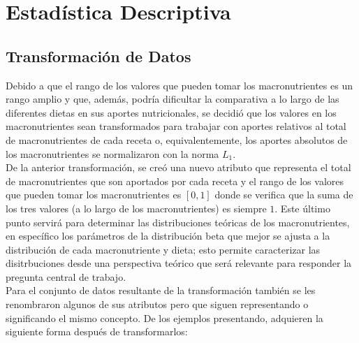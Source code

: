 \documentclass[12pt,a4paper]{article}
\begin{document}
\newpage

\section{Estadística Descriptiva}

    \subsection{Transformación de Datos}\label{subsec:data_trans}

        Debido a que el rango de los valores que pueden tomar los macronutrientes 
        es un rango amplio y que, además, podría dificultar la comparativa a lo largo 
        de las diferentes dietas en sus aportes nutricionales, se decidió que los 
        valores en los macronutrientes sean transformados para trabajar con aportes 
        relativos al total de macronutrientes de cada receta o, equivalentemente, los 
        aportes absolutos de los macronutrientes se normalizaron con la norma $L_1$.\\

        De la anterior transformación, se creó una nuevo atributo que representa el 
        total de macronutrientes que son aportados por cada receta y el rango de los 
        valores que pueden tomar los macronutrientes es $[0,1]$ donde se verifica que 
        la suma de los tres valores (a lo largo de los macronutrientes) es siempre $1$. 
        Este último punto servirá para determinar las distribuciones teóricas de los 
        macronutrientes, en específico los parámetros de la distribución beta que mejor 
        se ajusta a la distribución de cada macronutriente y dieta; esto permite caracterizar 
        las disitrbuciones desde una perspectiva teórico que será relevante para responder 
        la pregunta central de trabajo.\\

        Para el conjunto de datos resultante de la transformación también se les renombraron 
        algunos de sus atributos pero que siguen representando o significando el mismo concepto. 
        De los ejemplos presentando, adquieren la siguiente forma después de transformarlos:
\end{document}
